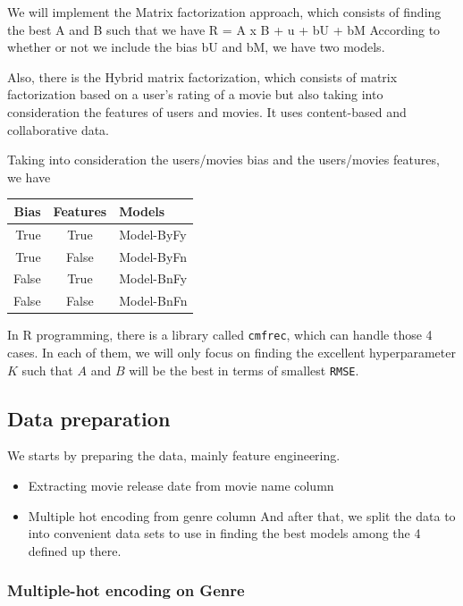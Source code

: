\documentclass[
]{article}
\providecommand{\tightlist}{%
  \setlength{\itemsep}{0pt}\setlength{\parskip}{0pt}}
\begin{document}
We will implement the Matrix factorization approach, which consists of
finding the best A and B such that we have R = A x B + u + bU + bM
According to whether or not we include the bias bU and bM, we have two
models.

Also, there is the Hybrid matrix factorization, which consists of matrix
factorization based on a user's rating of a movie but also taking into
consideration the features of users and movies. It uses content-based
and collaborative data.

Taking into consideration the users/movies bias and the users/movies
features, we have

\begin{longtable}[]{@{}rcl@{}}
\toprule\noalign{}
Bias & Features & Models \\
\midrule\noalign{}
\endhead
\bottomrule\noalign{}
\endlastfoot
True & True & Model-ByFy \\
True & False & Model-ByFn \\
False & True & Model-BnFy \\
False & False & Model-BnFn \\
\end{longtable}

In R programming, there is a library called \texttt{cmfrec}, which can
handle those 4 cases. In each of them, we will only focus on finding the
excellent hyperparameter \(K\) such that \(A\) and \(B\) will be the
best in terms of smallest \texttt{RMSE}.

\subsection{Data preparation}\label{data-preparation}

We starts by preparing the data, mainly feature engineering.

\begin{itemize}
\tightlist
\item
  Extracting movie release date from movie name column
\item
  Multiple hot encoding from genre column And after that, we split the
  data to into convenient data sets to use in finding the best models
  among the 4 defined up there.
\end{itemize}

\subsubsection{Multiple-hot encoding on
Genre}\label{multiple-hot-encoding-on-genre}
\end{document}
